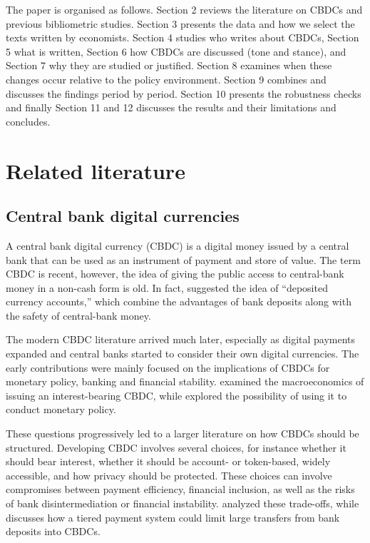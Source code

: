 \documentclass[11pt,a4paper]{article}
\begin{document}
The paper is organised as follows. Section 2 reviews the literature on CBDCs and previous bibliometric studies. 
Section 3 presents the data and how we select the texts written by economists. Section 4 studies who writes 
about CBDCs, Section 5 what is written, Section 6 how CBDCs are discussed (tone and stance), and Section 7 why 
they are studied or justified. Section 8 examines when these changes occur relative to the policy environment. 
Section 9 combines and discusses the findings period by period. Section 10 presents the robustness checks and 
finally Section 11 and 12 discusses the results and their limitations and concludes.

\section{Related literature}\label{sec:literature}
\subsection{Central bank digital currencies}
A central bank digital currency (CBDC) is a digital money issued by a central bank that 
can be used as an instrument of payment and store of value. The term CBDC is recent, 
however, the idea of giving the public access to central-bank money in a non-cash form 
is old. In fact, \textcite{tobin1987} suggested the idea of “deposited currency accounts,”
which combine the advantages of bank deposits along with the safety of central-bank money.

The modern CBDC literature arrived much later, especially as digital payments expanded 
and central banks started to consider their own digital currencies. The early contributions 
were mainly focused on the implications of CBDCs for monetary policy, banking and financial 
stability. \textcite{barrdear2016} examined the macroeconomics of issuing an interest-bearing 
CBDC, while \textcite{bordo2017} explored the possibility of using it to conduct monetary policy.

These questions progressively led to a larger literature on how CBDCs should be structured. 
Developing CBDC involves several choices, for instance whether it should bear interest, 
whether it should be account- or token-based, widely accessible, and how privacy should 
be protected. These choices can involve compromises between payment efficiency, financial 
inclusion, as well as the risks of bank disintermediation or financial instability. 
\textcite{agur2019} analyzed these trade-offs, while \textcite{bindseil2020} discusses 
how a tiered payment system could limit large transfers from bank deposits into CBDCs.
\end{document}
